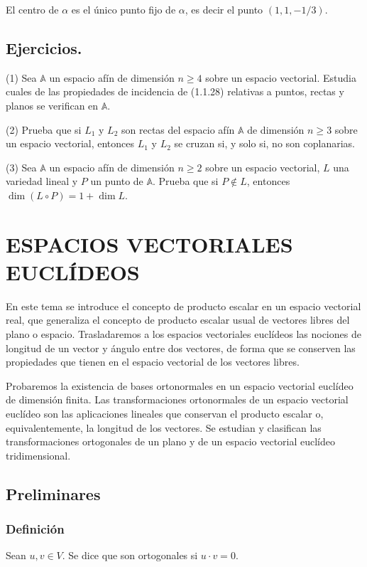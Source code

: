 \documentclass[12pt, a4paper, ones, notitlepage, openany,titlepage]{article}
\begin{document}
El centro de $\alpha$ es el único punto fijo de $\alpha$, es decir el punto $(1,1,-1 / 3)$.

\subsection{Ejercicios.}
(1) Sea $\mathbb{A}$ un espacio afín de dimensión $n \geq 4$ sobre un espacio vectorial. Estudia cuales de las propiedades de incidencia de (1.1.28) relativas a puntos, rectas y planos se verifican en $\mathbb{A}$.

(2) Prueba que si $L_{1}$ y $L_{2}$ son rectas del espacio afín $\mathbb{A}$ de dimensión $n \geq 3$ sobre un espacio vectorial, entonces $L_{1}$ y $L_{2}$ se cruzan si, y solo si, no son coplanarias.

(3) Sea $\mathbb{A}$ un espacio afín de dimensión $n \geq 2$ sobre un espacio vectorial, $L$ una variedad lineal y $P$ un punto de $\mathbb{A}$. Prueba que si $P \notin L$, entonces $\dim (L \circ P)=1+\dim  L$.

\section{ESPACIOS VECTORIALES EUCLÍDEOS}
En este tema se introduce el concepto de producto escalar en un espacio vectorial real, que generaliza el concepto de producto escalar usual de vectores libres del plano o espacio. Trasladaremos a los espacios vectoriales euclídeos las nociones de longitud de un vector y ángulo entre dos vectores, de forma que se conserven las propiedades que tienen en el espacio vectorial de los vectores libres.

Probaremos la existencia de bases ortonormales en un espacio vectorial euclídeo de dimensión finita. Las transformaciones ortonormales de un espacio vectorial euclídeo son las aplicaciones lineales que conservan el producto escalar o, equivalentemente, la longitud de los vectores. Se estudian y clasifican las transformaciones ortogonales de un plano y de un espacio vectorial euclídeo tridimensional.

\subsection{Preliminares}
\subsubsection{Definición}
Sean $u,v \in V$. Se dice que son ortogonales si $u\cdot v = 0$.
\end{document}

